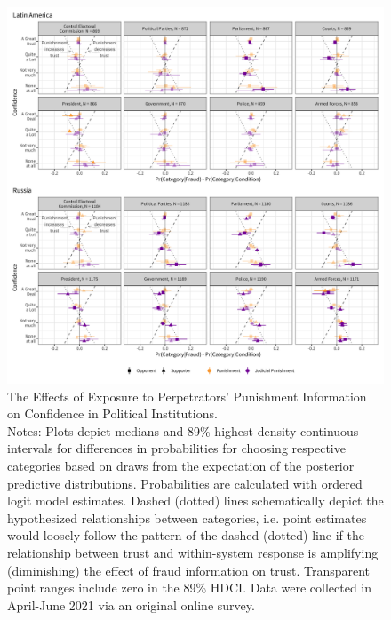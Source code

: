 \documentclass[11pt, ngerman,english,a4]{article}
\begin{document}
\begin{figure}
    \centering
    \includegraphics[width=\linewidth,trim=4 4 4 4,clip]{figs/cond_hdi89_1.png}
    \caption{The Effects of Exposure to Perpetrators' Punishment Information on Confidence in Political Institutions.  \\
     \footnotesize{Notes: Plots depict medians and 89\% highest-density continuous intervals for differences in probabilities for choosing respective categories based on draws from the expectation of the posterior predictive distributions. Probabilities are calculated with ordered logit model estimates.
     Dashed (dotted) lines schematically depict the hypothesized relationships between categories, i.e. point estimates would loosely follow the pattern of the dashed (dotted) line if the relationship between trust and within-system response is amplifying (diminishing) the effect of fraud information on trust. Transparent point ranges include zero in the 89\% HDCI.
     Data were collected in April-June 2021 via an original online survey. } }
    \label{fig:het}
    \end{figure}
\end{document}
